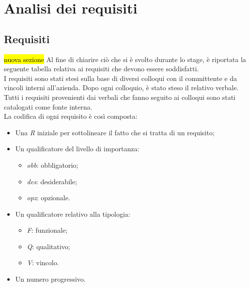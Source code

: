 \section{Analisi dei requisiti}
\subsection{Requisiti}
\hl{nuova sezione}
Al fine di chiarire ciò che si è svolto durante lo stage, è riportata la seguente tabella relativa ai requisiti che devono essere soddisfatti.\\
I requisiti sono stati stesi sulla base di diversi colloqui con il committente e da vincoli interni all'azienda. Dopo ogni  colloquio, è stato steso il relativo verbale.\\ Tutti i requisiti provenienti dai verbali che fanno seguito ai colloqui sono stati catalogati come fonte interna.\\
La codifica di ogni requisito è così composta:
\begin{itemize}
	\item Una \textit{R} iniziale per sottolineare il fatto che si tratta di un requisito;
	\item Un qualificatore del livello di importanza:
		\begin{itemize}
			\item \textit{obb}: obbligatorio;
			\item \textit{des}: desiderabile;
			\item \textit{opz}: opzionale.
		\end{itemize}
	\item Un qualificatore relativo alla tipologia:
		\begin{itemize}
			\item \textit{F}: funzionale;
			\item \textit{Q}: qualitativo;
			\item \textit{V}: vincolo.
		\end{itemize}
	\item Un numero progressivo.
\end{itemize}

